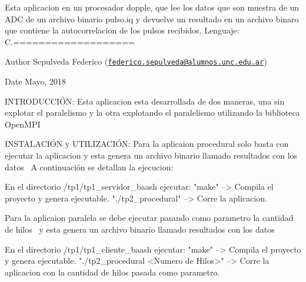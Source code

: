 Esta aplicacion en un procesador dopple, que lee los datos que son muestra de un A\+DC de un archivo binario pulso.\+iq y devuelve un resultado en un archivo binaro que contiene la autocorrelacion de los pulsos recibidos. Lenguaje\+: C.===================

\begin{DoxyAuthor}{Author}
Sepulveda Federico (\href{mailto:federico.sepulveda@alumnos.unc.edu.ar}{\tt federico.\+sepulveda@alumnos.\+unc.\+edu.\+ar}) 
\end{DoxyAuthor}
\begin{DoxyDate}{Date}
Mayo, 2018
\end{DoxyDate}
\begin{DoxyParagraph}{I\+N\+T\+R\+O\+D\+U\+C\+C\+IÓN\+:}
Esta aplicacion esta desarrollada de dos maneras, una sin explotar el paralelismo y la otra explotando el paralelismo utilizando la biblioteca Open\+M\+PI
\end{DoxyParagraph}
\begin{DoxyParagraph}{I\+N\+S\+T\+A\+L\+A\+C\+IÓN y U\+T\+I\+L\+I\+Z\+A\+C\+IÓN\+:}
Para la aplicaion procedural solo basta con ejecutar la aplicacion y esta genera un archivo binario llamado resultados con los datos~\newline
A continuación se detallan la ejecucion\+:~\newline
\begin{DoxyVerb}En el directorio /tp1/tp1_servidor_baash ejecutar:
"make"                                  --> Compila el proyecto y genera ejecutable.
"./tp2_procedural"              --> Corre la aplicacion.
\end{DoxyVerb}

\end{DoxyParagraph}
Para la aplicaion paralela se debe ejecutar pasando como parametro la cantidad de hilos~\newline
y esta genera un archivo binario llamado resultados con los datos~\newline
\begin{DoxyVerb}En el directorio /tp1/tp1_cliente_baash ejecutar:
"make"                                  --> Compila el proyecto y genera ejecutable.
"./tp2_procedural <Numero de Hilos>"                    --> Corre la aplicacion con la cantidad de hilos pasada como parametro.\end{DoxyVerb}
 